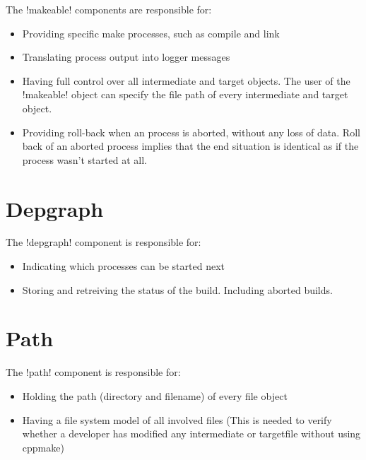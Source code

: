 The !makeable! components are responsible for:
\begin{itemize}
\item Providing specific make processes, such as compile and link
\item Translating process output into logger messages
\item Having full control over all intermediate and target objects. The user
      of the !makeable! object can specify the file path of
	  every intermediate and target object.
\item Providing roll-back when an process is aborted, without any loss of data.
      Roll back of an aborted process implies that the end situation is identical
	  as if the process wasn't started at all.
\end{itemize}

\section{Depgraph}
\label{sec:share000.cppmake.depgraph}

The !depgraph! component is responsible for:
\begin{itemize}
\item Indicating which processes can be started next
\item Storing and retreiving the status of the build. Including aborted builds.
\end{itemize}

\section{Path}
\label{sec:share000.cppmake.path}

The !path! component is responsible for:
\begin{itemize}
\item Holding the path (directory and filename) of every file object
\item Having a file system model of all involved files (This is needed to verify
      whether a developer has modified any intermediate or targetfile without
	  using cppmake)
\end{itemize}


